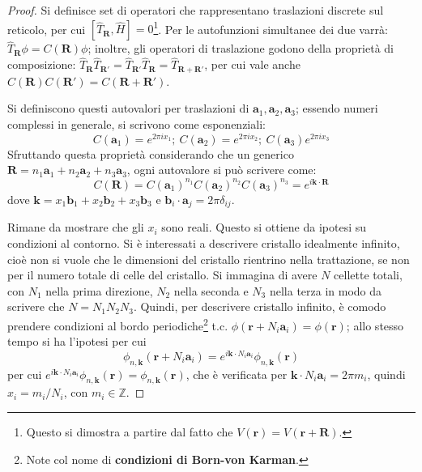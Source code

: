 \documentclass[10pt, a4paper]{scrartcl}
\numberwithin{equation}{subsection}
\theoremstyle{style1}
\theoremstyle{style2}
\begin{document}
\begin{proof}
	Si  definisce set di operatori che rappresentano traslazioni discrete sul reticolo, per cui $[\hat{T}_\mathbf{R} , \hat{H}] = 0$\footnote{Questo si dimostra a partire dal fatto che $V(\mathbf{r} ) = V(\mathbf{r} +\mathbf{R} )$.}. Per le autofunzioni simultanee dei due varr\`a: $\hat{T}_\mathbf{R} \phi  = C(\mathbf{R} ) \phi $; inoltre, gli operatori di traslazione godono della propriet\`a di composizione: $\hat{T}_\mathbf{R} \hat{T}_{\mathbf{R}'}  = \hat{T}_{\mathbf{R} '}  \hat{T}_\mathbf{R} = \hat{T}_{\mathbf{R} + \mathbf{R} '} $, per cui vale anche $C(\mathbf{R} ) C(\mathbf{R} ') = C(\mathbf{R} +\mathbf{R} ')$. 

	Si definiscono questi autovalori per traslazioni di $\mathbf{a} _1, \mathbf{a} _2, \mathbf{a}_3 $; essendo numeri complessi in generale, si scrivono come esponenziali:
	\[
	C(\mathbf{a} _1) = e^{2\pi i x_1} ; \ C(\mathbf{a} _2) = e^{2\pi i x_2} ; \ C(\mathbf{a} _3) e^{2\pi i x_3} 
	\] 
	Sfruttando questa propriet\`a considerando che un generico $\mathbf{R} = n_1 \mathbf{a} _1 + n_2 \mathbf{a} _2 + n_3 \mathbf{a}_3 $, ogni autovalore si pu\`o scrivere come:
	\begin{equation}
		C( \mathbf{R} ) = C( \mathbf{a} _1) ^{n_1} C(\mathbf{a} _2)^{n_2} C(\mathbf{a} _3) ^{n_3} = e^{ i \mathbf{k} \cdot \mathbf{R} } 
	\end{equation}
dove $\mathbf{k} = x_1 \mathbf{b} _1 + x_2 \mathbf{b} _2  + x_3 \mathbf{b} _3$ e $\mathbf{b} _i \cdot \mathbf{a}_j = 2\pi \delta _{ij} $. 

Rimane da mostrare che gli $x_i$ sono reali. 
Questo si ottiene da ipotesi su condizioni al contorno. Si \`e interessati a descrivere cristallo idealmente infinito, cio\`e non si vuole che le dimensioni del cristallo rientrino nella trattazione, se non per il numero totale di celle del cristallo. Si immagina di avere $N$ cellette totali, con $N_1$ nella prima direzione, $N_2$ nella seconda e $N_3$ nella terza in modo da scrivere che $N = N_1N_2N_3$. Quindi, per descrivere cristallo infinito, \`e comodo prendere condizioni al bordo periodiche\footnote{Note col nome di \textbf{condizioni di Born-von Karman}.} t.c. $\phi (\mathbf{r} + N_i \mathbf{a}_i) = \phi (\mathbf{r} ) $; allo stesso tempo si ha l'ipotesi per cui
\[
\phi _{n, \mathbf{k} } (\mathbf{r} + N_i \mathbf{a} _i) = e^{i \mathbf{k} \cdot N_i \mathbf{a} _i} \phi _{n , \mathbf{k} } (\mathbf{r} )
\] 
per cui $e^{i \mathbf{k} \cdot N_i \mathbf{a}_i } \phi _{n, \mathbf{k} } (\mathbf{r} ) = \phi _{n , \mathbf{k} } (\mathbf{r} )$, che \`e verificata per $\mathbf{k} \cdot N_i \mathbf{a} _i = 2\pi m_i $, quindi $x_i = m_i /  N_i$, con $m_i\in \mathbb{Z}$.
\end{proof}
\end{document}
